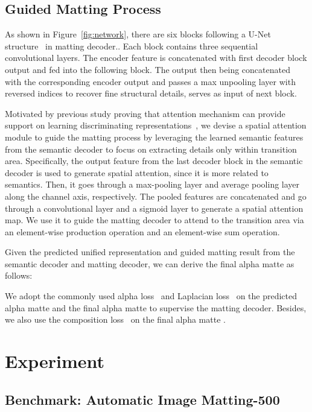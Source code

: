 \documentclass{article}
\begin{document}
\subsection{Guided Matting Process}

 As shown in Figure~\ref{fig:network}, there are six blocks following a U-Net structure~\cite{ronneberger2015u} in matting decoder.. Each block contains three sequential  convolutional layers. The encoder feature is concatenated with first decoder block output and fed into the following block. The output then being concatenated with the corresponding encoder output and passes a max unpooling layer with reversed indices to recover fine structural details, serves as input of next block.

Motivated by previous study proving that attention mechanism can provide support on learning discriminating representations~\cite{ma2020auto}, we devise a spatial attention module to guide the matting process by leveraging the learned semantic features from the semantic decoder to focus on extracting details only within transition area. Specifically, the output feature from the last decoder block in the semantic decoder is used to generate spatial attention, since it is more related to semantics. Then, it goes through a max-pooling layer and average pooling layer along the channel axis, respectively. The pooled features are concatenated and go through a convolutional layer and a sigmoid layer to generate a spatial attention map. We use it to guide the matting decoder to attend to the transition area via an element-wise production operation and an element-wise sum operation. 

Given the predicted unified representation  and guided matting result  from the semantic decoder and matting decoder, we can derive the final alpha matte  as follows:

We adopt the commonly used alpha loss~\cite{xu2017deep} and Laplacian loss~\cite{hou2019context} on the predicted alpha matte  and the final alpha matte  to supervise the matting decoder. Besides, we also use the composition loss~\cite{xu2017deep} on the final alpha matte .

\section{Experiment}

\subsection{Benchmark: Automatic Image Matting-500}
\end{document}
